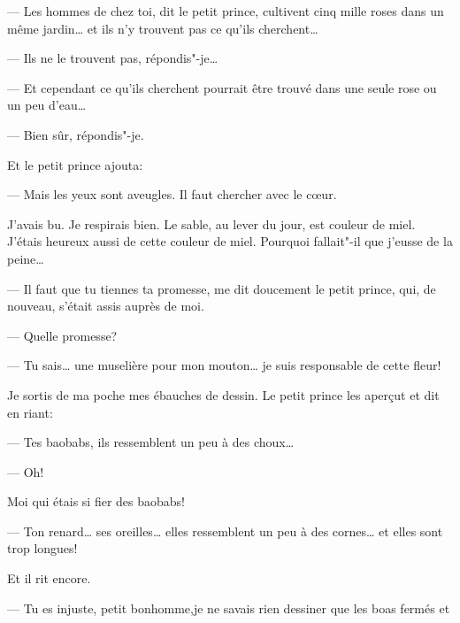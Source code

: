 --- Les hommes de chez toi, dit le petit prince, cultivent cinq mille roses dans un
même jardin\ldots{} et ils n'y trouvent pas ce qu'ils cherchent\ldots{}

--- Ils ne le trouvent pas, répondis"-je\ldots{}

--- Et cependant ce qu'ils cherchent pourrait être trouvé dans une seule rose ou un
peu d'eau\ldots{}

--- Bien sûr, répondis"-je.

Et le petit prince ajouta:

--- Mais les yeux sont aveugles. Il faut chercher avec le cœur.

\medskip

J'avais bu. Je respirais bien. Le sable, au lever du jour, est couleur de miel.
J'étais heureux aussi de cette couleur de miel. Pourquoi fallait"-il que j'eusse
de la peine\ldots{}

--- Il faut que tu tiennes ta promesse, me dit doucement le petit prince, qui, de
nouveau, s'était assis auprès de moi.

--- Quelle promesse?

--- Tu sais\ldots{} une muselière pour mon mouton\ldots{} je suis responsable de
cette fleur!

Je sortis de ma poche mes ébauches de dessin. Le petit prince les aperçut et dit
en riant:

--- Tes baobabs, ils ressemblent un peu à des choux\ldots{}

--- Oh!

Moi qui étais si fier des baobabs!

--- Ton renard\ldots{} ses oreilles\ldots{} elles ressemblent un peu à des cornes\ldots{}
et elles sont trop longues!

Et il rit encore.

--- Tu es injuste, petit bonhomme,je ne savais rien dessiner que les boas fermés
et les boas ouverts.

--- Oh! ça ira, dit"-il, les enfants savent.

Je crayonnai donc une muselière. Et j'eus le cœur serré en la lui donnant:

--- Tu as des projets que j'ignore\ldots{}

Mais il ne me répondit pas. Il me dit:

--- Tu sais, ma chute sur la Terre\ldots{} c'en sera demain l'anniversaire\ldots{}

Puis, après un silence il dit encore:

--- J'étais tombé tout près d'ici\ldots{}

